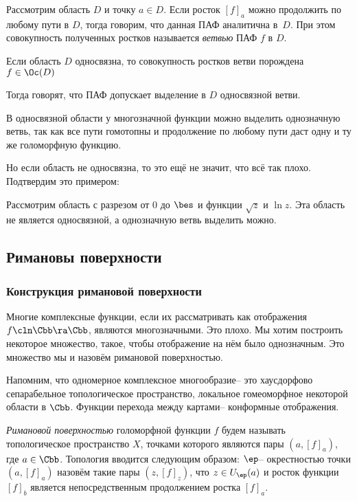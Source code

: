 \documentclass[a4paper]{article}
\begin{document}
\begin{df}
Рассмотрим область $D$ и точку $a\in D$. Если росток $[f]_a$ можно продолжить по любому пути в $D$,
тогда говорим, что данная ПАФ аналитична в~$D$.
При этом совокупность полученных ростков называется \emph{ветвью} ПАФ $f$ в $D$.
\end{df}

\begin{imp}
Если область $D$ односвязна, то совокупность ростков ветви порождена $f\in\Oc(D)$
 \end{imp}
 Тогда говорят, что ПАФ допускает выделение в $D$ односвязной ветви.

\begin{imp}
В односвязной области у многозначной функции можно выделить однозначную ветвь, так как все пути гомотопны
и продолжение по любому пути даст одну и ту же голоморфную функцию.
\end{imp}

Но если область не односвязна, то это ещё не значит, что всё так плохо. Подтвердим это примером:

\begin{ex}
Рассмотрим область с разрезом от $0$ до $\bes$ и функции $\sqrt z$ и $\ln z$.
Эта область не является односвязной, а однозначную ветвь выделить можно.
\end{ex}

\subsection{Римановы поверхности}

\subsubsection{Конструкция римановой поверхности}

Многие комплексные функции, если их рассматривать как отображения $f\cln \Cbb\ra\Cbb$, являются многозначными.
Это плохо. Мы хотим построить некоторое множество, такое, чтобы отображение на нём было однозначным. Это множество
мы и назовём римановой поверхностью.

Напомним, что одномерное комплексное многообразие-- это хаусдорфово сепарабельное топологическое пространство,
локальное гомеоморфное некоторой области в $\Cbb$. Функции перехода между картами-- конформные отображения.

\begin{df}
\emph{Римановой поверхностью} голоморфной функции $f$ будем называть топологическое пространство $X$,
точками которого являются пары $(a, [f]_a)$, где $a \in \Cbb$. Топология вводится следующим образом:
$\ep$-- окрестностью точки $(a, [f]_a)$ назовём такие пары $(z, [f]_z)$, что $z \in U_\ep(a)$ и
росток функции $[f]_b$ является непосредственным продолжением ростка $[f]_a$.
\end{df}
\end{document}
